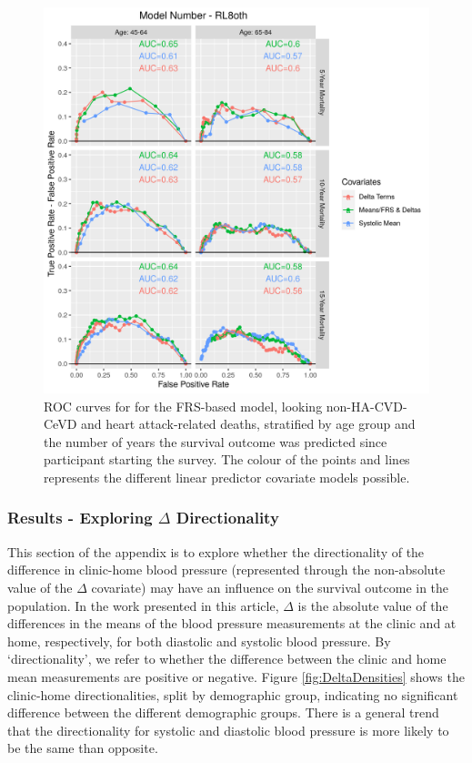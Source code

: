 \documentclass[
]{article}
\begin{document}
\begin{figure}
\hypertarget{fig:ROC_RL8oth}{%
\centering
\includegraphics{./Rmarkdown_Plots/ROC_CAx-Covariates_EventType_RL8oth.png}
\caption{ROC curves for for the FRS-based model, looking non-HA-CVD-CeVD and heart attack-related deaths, stratified by age group and the number of years the survival outcome was predicted since participant starting the survey. The colour of the points and lines represents the different linear predictor covariate models possible.}\label{fig:ROC_RL8oth}
}
\end{figure}

\hypertarget{results---exploring-delta-directionality}{%
\subsubsection{\texorpdfstring{Results - Exploring \(\Delta\) Directionality}{Results - Exploring \textbackslash Delta Directionality}}\label{results---exploring-delta-directionality}}

This section of the appendix is to explore whether the directionality of the difference in clinic-home blood pressure (represented through the non-absolute value of the \(\Delta\) covariate) may have an influence on the survival outcome in the population. In the work presented in this article, \(\Delta\) is the absolute value of the differences in the means of the blood pressure measurements at the clinic and at home, respectively, for both diastolic and systolic blood pressure. By `directionality', we refer to whether the difference between the clinic and home mean measurements are positive or negative. Figure \ref{fig:DeltaDensities} shows the clinic-home directionalities, split by demographic group, indicating no significant difference between the different demographic groups. There is a general trend that the directionality for systolic and diastolic blood pressure is more likely to be the same than opposite.
\end{document}
